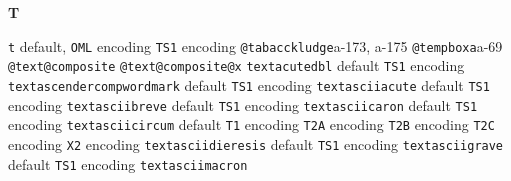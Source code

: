 \documentclass[twoside]{ltxdoc}
\makeatletter
\renewenvironment{theindex}{%
   \@restonecoltrue
   \if@twocolumn\@restonecolfalse\fi
   \columnseprule \z@
   \columnsep 35\p@
   \twocolumn[\index@prologue]%
   \IndexParms
   \let\item\@idxitem
   \ignorespaces
}{\if@restonecol\onecolumn\else\clearpage\fi}
\makeatother
\begin{document}
\begin{theindex}
  \indexspace
{\bfseries\hfil T\hfil}\nopagebreak

  \item \texttt  {t}\efill 
    \subitem default\pfill {}, 
    \subitem \texttt  {OML} encoding\pfill {}
    \subitem \texttt  {TS1} encoding\pfill {}
  \item \texttt  {@tabacckludge}\pfill a-173, a-175
  \item \texttt  {@tempboxa}\pfill a-69
  \item \texttt  {@text@composite}\pfill {}
  \item \texttt  {@text@composite@x}\pfill {}
  \item \texttt  {textacutedbl}\efill 
    \subitem default\pfill {}
    \subitem \texttt  {TS1} encoding\pfill {}
  \item \texttt  {textascendercompwordmark}\efill 
    \subitem default\pfill {}
    \subitem \texttt  {TS1} encoding\pfill {}
  \item \texttt  {textasciiacute}\efill 
    \subitem default\pfill {}
    \subitem \texttt  {TS1} encoding\pfill {}
  \item \texttt  {textasciibreve}\efill 
    \subitem default\pfill {}
    \subitem \texttt  {TS1} encoding\pfill {}
  \item \texttt  {textasciicaron}\efill 
    \subitem default\pfill {}
    \subitem \texttt  {TS1} encoding\pfill {}
  \item \texttt  {textasciicircum}\efill 
    \subitem default\pfill {}
    \subitem \texttt  {T1} encoding\pfill {}
    \subitem \texttt  {T2A} encoding\pfill {}
    \subitem \texttt  {T2B} encoding\pfill {}
    \subitem \texttt  {T2C} encoding\pfill {}
    \subitem \texttt  {X2} encoding\pfill {}
  \item \texttt  {textasciidieresis}\efill 
    \subitem default\pfill {}
    \subitem \texttt  {TS1} encoding\pfill {}
  \item \texttt  {textasciigrave}\efill 
    \subitem default\pfill {}
    \subitem \texttt  {TS1} encoding\pfill {}
  \item \texttt  {textasciimacron}\efill 

\end{theindex}
\end{document}
